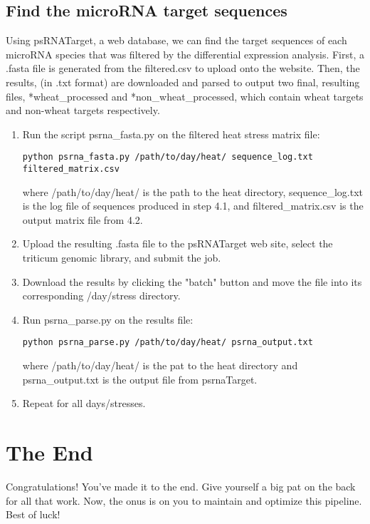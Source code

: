 \documentclass[12pt,titlepage]{article}
\begin{document}
\subsection{Find the microRNA target sequences}
Using psRNATarget, a web database, we can find the target sequences of each microRNA species that was filtered by the differential expression analysis. First, a .fasta file is generated from the filtered.csv to upload onto the website. Then, the results, (in .txt format) are downloaded and parsed to output two final, resulting files, *wheat\_processed and *non\_wheat\_processed, which contain wheat targets and non-wheat targets respectively.
\begin{enumerate}
\item Run the script psrna\_fasta.py on the filtered heat stress matrix file:
\begin{tcolorbox}
\begin{lstlisting}
python psrna_fasta.py /path/to/day/heat/ sequence_log.txt filtered_matrix.csv 
\end{lstlisting}
\end{tcolorbox}
where /path/to/day/heat/ is the path to the heat directory, sequence\_log.txt is the log file of sequences produced in step 4.1, and filtered\_matrix.csv is the output matrix file from 4.2.
\item Upload the resulting .fasta file to the psRNATarget web site, select the triticum genomic library, and submit the job.
\item Download the results by clicking the "batch" button and move the file into its corresponding /day/stress directory.
\item Run psrna\_parse.py on the results file:
\begin{tcolorbox}
\begin{lstlisting}
python psrna_parse.py /path/to/day/heat/ psrna_output.txt 
\end{lstlisting}
\end{tcolorbox}
where /path/to/day/heat/ is the pat to the heat directory and psrna\_output.txt is the output file from psrnaTarget.
\item Repeat for all days/stresses.
\end{enumerate} 

\section*{The End}
Congratulations! You've made it to the end. Give yourself a big pat on the back for all that work. Now, the onus is on you to maintain and optimize this pipeline. Best of luck!
\end{document}

